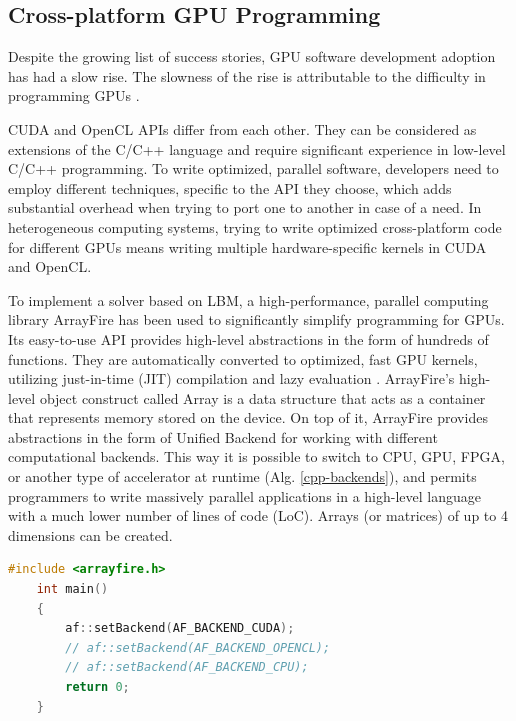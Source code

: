 \subsection{Cross-platform GPU Programming} \label{sec:computer-simulations-using-gpus}

Despite the growing list of success stories, GPU software development adoption has had a slow rise. The slowness of the rise is attributable to the difficulty in programming GPUs \citep{malcolmArrayFireGPUAcceleration2012a}.

CUDA and OpenCL APIs differ from each other. They can be considered as extensions of the C/C++ language and require significant experience in low-level C/C++ programming. To write optimized, parallel software, developers need to employ different techniques, specific to the API they choose, which adds substantial overhead when trying to port one to another in case of a need. In heterogeneous computing systems, trying to write optimized cross-platform code for different GPUs means writing multiple hardware-specific kernels in CUDA and OpenCL.

To implement a solver based on LBM, a high-performance, parallel computing library ArrayFire has been used to significantly simplify programming for GPUs. Its easy-to-use API provides high-level abstractions in the form of hundreds of functions. They are automatically converted to optimized, fast GPU kernels, utilizing just-in-time (JIT) compilation and lazy evaluation \citep{chrzeszczykMatrixComputationsGPUb}. ArrayFire's high-level object construct called Array is a data structure that acts as a container that represents memory stored on the device. On top of it, ArrayFire provides abstractions in the form of Unified Backend for working with different computational backends. This way it is possible to switch to CPU, GPU, FPGA, or another type of accelerator at runtime \citep{Yalamanchili2015} (Alg. \ref{cpp-backends}), and permits programmers to write massively parallel applications in a high-level language with a much lower number of lines of code (LoC). Arrays (or matrices) of up to 4 dimensions can be created. 

\begin{lstlisting}[language=Cpp, caption=C++ code for setting different computing backends., label=cpp-backends]
	#include <arrayfire.h>
	int main()
	{
		af::setBackend(AF_BACKEND_CUDA);
		// af::setBackend(AF_BACKEND_OPENCL);
		// af::setBackend(AF_BACKEND_CPU);
		return 0;
	}
\end{lstlisting}

